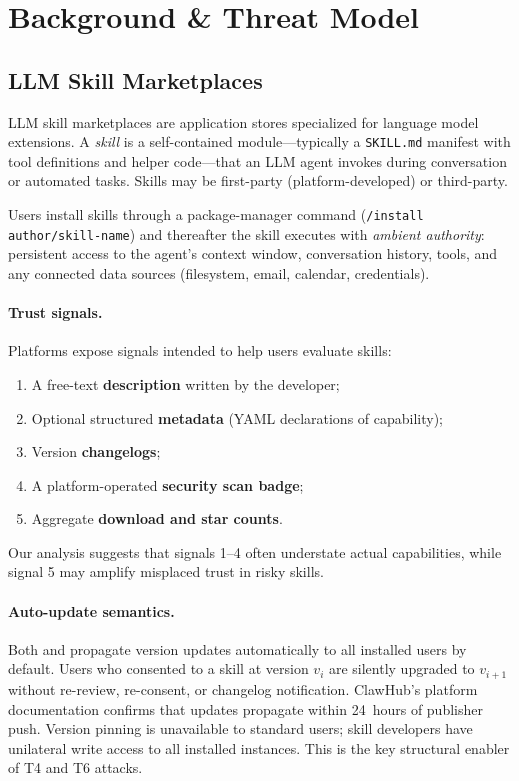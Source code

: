 
\section{Background \& Threat Model}
\label{sec:background}

\subsection{LLM Skill Marketplaces}

LLM skill marketplaces are application stores specialized for language
model extensions. A \emph{skill} is a self-contained module---typically a
\texttt{SKILL.md} manifest with tool definitions and helper code---that an
LLM agent invokes during conversation or automated tasks.
Skills may be first-party (platform-developed) or third-party.

Users install skills through a package-manager command
(\eg \texttt{/install author/skill-name}) and thereafter the skill
executes with \emph{ambient authority}: persistent access to the
agent's context window, conversation history, tools, and any connected
data sources (filesystem, email, calendar, credentials).

\paragraph{Trust signals.}
Platforms expose signals intended to help users evaluate skills:
\begin{enumerate}
    \item A free-text \textbf{description} written by the developer;
    \item Optional structured \textbf{metadata} (YAML declarations of capability);
    \item Version \textbf{changelogs};
    \item A platform-operated \textbf{security scan badge};
    \item Aggregate \textbf{download and star counts}.
\end{enumerate}
Our analysis suggests that signals 1--4 often understate actual capabilities, while signal 5 may amplify misplaced trust in risky skills.

\paragraph{Auto-update semantics.}
Both \clawhub{} and \skillssh{} propagate version updates automatically
to all installed users by default.
Users who consented to a skill at version $v_i$ are silently upgraded to
$v_{i+1}$ without re-review, re-consent, or changelog notification.
ClawHub's platform documentation confirms that updates propagate within
24~hours of publisher push.
Version pinning is unavailable to standard users; skill developers have
unilateral write access to all installed instances.
This is the key structural enabler of T4 and T6 attacks.

